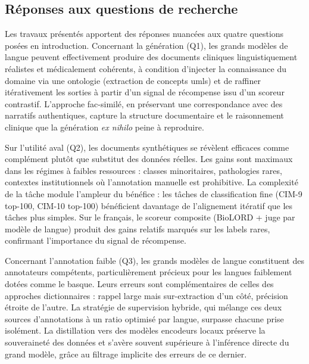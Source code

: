 

\subsection{Réponses aux questions de recherche}

Les travaux présentés apportent des réponses nuancées aux quatre questions posées en
introduction. Concernant la génération (Q1), les grands modèles de langue peuvent
effectivement produire des documents cliniques linguistiquement réalistes et médicalement
cohérents, à condition d'injecter la connaissance du domaine via une ontologie
(extraction de concepts \gls{umls}) et de raffiner itérativement les sorties à partir d'un
signal de récompense issu d'un scoreur contrastif. L'approche fac-similé, en préservant
une correspondance avec des narratifs authentiques, capture la structure documentaire et
le raisonnement clinique que la génération \textit{ex nihilo} peine à reproduire.

Sur l'utilité aval (Q2), les documents synthétiques se révèlent efficaces comme complément
plutôt que substitut des données réelles. Les gains sont maximaux dans les régimes à faibles
ressources : classes minoritaires, pathologies rares, contextes institutionnels où l'annotation
manuelle est prohibitive. La complexité de la tâche module l'ampleur du bénéfice : les
tâches de classification fine (CIM-9 top-100, CIM-10 top-100) bénéficient davantage de
l'alignement itératif que les tâches plus simples. Sur le français, le scoreur composite
(BioLORD + juge par modèle de langue) produit des gains relatifs marqués sur les
labels rares, confirmant l'importance du signal de récompense.

Concernant l'annotation faible (Q3), les grands modèles de langue constituent des
annotateurs compétents, particulièrement précieux pour les langues faiblement dotées
comme le basque. Leurs erreurs sont complémentaires de celles des approches
dictionnaires : rappel large mais sur-extraction d'un côté, précision étroite de l'autre. La
stratégie de supervision hybride, qui mélange ces deux sources d'annotations à un ratio
optimisé par langue, surpasse chacune prise isolément. La distillation vers des modèles
encodeurs locaux préserve la souveraineté des données et s'avère souvent supérieure à
l'inférence directe du grand modèle, grâce au filtrage implicite des erreurs de ce dernier.

